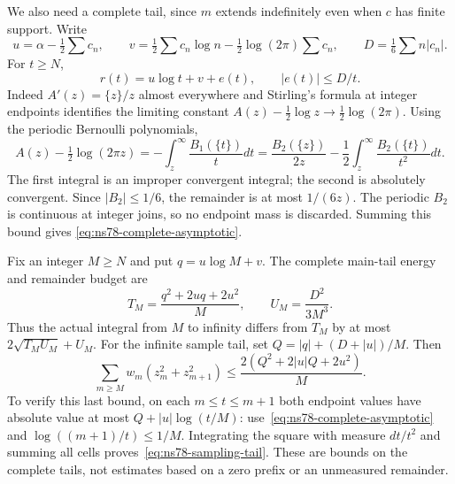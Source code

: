 \documentclass[11pt]{article}
\theoremstyle{remark}
\begin{document}
We also need a complete tail, since $m$ extends indefinitely even when
$c$ has finite support. Write
\[
 u=\alpha-\tfrac12\sum c_n,\qquad
 v=\tfrac12\sum c_n\log n-\tfrac12\log(2\pi)\sum c_n,
 \qquad D=\tfrac16\sum n|c_n|.
\]
For $t\geq N$,
\begin{equation}
 r(t)=u\log t+v+e(t),\qquad |e(t)|\leq D/t.
 \label{eq:ns78-complete-asymptotic}
\end{equation}
Indeed $A'(z)=\{z\}/z$ almost everywhere and Stirling's formula at
integer endpoints identifies the limiting constant
$A(z)-\tfrac12\log z\to\tfrac12\log(2\pi)$.
Using the periodic Bernoulli polynomials,
\[
 A(z)-\tfrac12\log(2\pi z)
 =-\int_z^\infty\frac{B_1(\{t\})}{t}dt
 =\frac{B_2(\{z\})}{2z}
       -\frac12\int_z^\infty\frac{B_2(\{t\})}{t^2}dt.
\]
The first integral is an improper convergent integral; the second is
absolutely convergent. Since $|B_2|\leq1/6$, the remainder is at most
$1/(6z)$. The periodic $B_2$ is continuous at integer joins, so no
endpoint mass is discarded. Summing this bound gives
\eqref{eq:ns78-complete-asymptotic}.

Fix an integer $M\geq N$ and put $q=u\log M+v$. The complete
main-tail energy and remainder budget are
\[
 T_M=\frac{q^2+2uq+2u^2}{M},\qquad
 U_M=\frac{D^2}{3M^3}.
\]
Thus the actual integral from $M$ to infinity differs from $T_M$ by
at most $2\sqrt{T_MU_M}+U_M$. For the infinite sample tail, set
$Q=|q|+(D+|u|)/M$. Then
\begin{equation}
 \sum_{m\geq M}w_m(z_m^2+z_{m+1}^2)
 \leq \frac{2(Q^2+2|u|Q+2u^2)}{M}.
 \label{eq:ns78-sampling-tail}
\end{equation}
To verify this last bound, on each $m\leq t\leq m+1$ both endpoint
values have absolute value at most $Q+|u|\log(t/M)$:
use~\eqref{eq:ns78-complete-asymptotic} and
$\log((m+1)/t)\leq1/M$. Integrating the square with measure $dt/t^2$
and summing all cells proves~\eqref{eq:ns78-sampling-tail}.
These are bounds on the complete tails, not estimates based on a zero
prefix or an unmeasured remainder.
\end{document}
